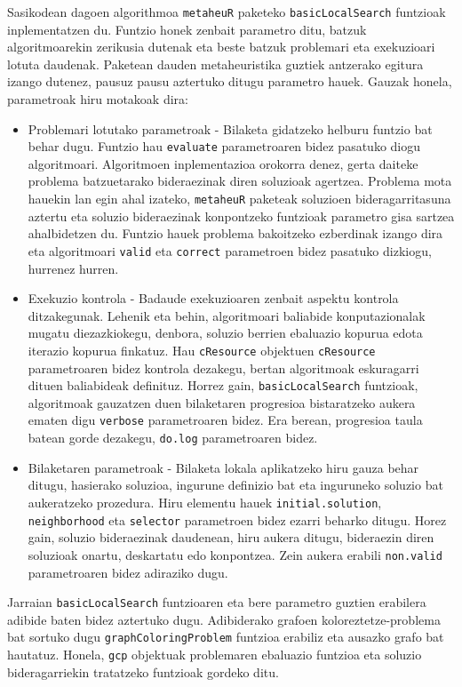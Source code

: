 \documentclass[eu]{ifirak}\usepackage[]{graphicx}\usepackage[]{color}
\newcommand{\code}[1]{\texttt{#1}}
\begin{document}
Sasikodean dagoen algorithmoa \code{metaheuR} paketeko \code{basicLocalSearch} funtzioak inplementatzen du. Funtzio honek zenbait parametro ditu, batzuk algoritmoarekin zerikusia dutenak eta beste batzuk problemari eta exekuzioari lotuta daudenak. Paketean dauden metaheuristika guztiek antzerako egitura izango dutenez, pausuz pausu aztertuko ditugu parametro hauek. Gauzak honela, parametroak hiru motakoak dira:
\begin{itemize}
\item Problemari lotutako parametroak - Bilaketa gidatzeko helburu funtzio bat behar dugu. Funtzio hau \code{evaluate} parametroaren bidez pasatuko diogu algoritmoari. Algoritmoen inplementazioa orokorra denez, gerta daiteke problema batzuetarako bideraezinak diren soluzioak agertzea. Problema mota hauekin lan egin ahal izateko, \code{metaheuR} paketeak soluzioen bideragarritasuna aztertu eta soluzio bideraezinak konpontzeko funtzioak parametro gisa sartzea ahalbidetzen du. Funtzio hauek problema bakoitzeko ezberdinak izango dira eta algoritmoari \code{valid} eta \code{correct} parametroen bidez pasatuko dizkiogu, hurrenez hurren.

\item Exekuzio kontrola - Badaude exekuzioaren zenbait aspektu kontrola ditzakegunak. Lehenik eta behin, algoritmoari baliabide konputazionalak mugatu diezazkiokegu, denbora, soluzio berrien ebaluazio kopurua edota iterazio kopurua finkatuz. Hau \code{cResource} objektuen  \code{cResource} parametroaren bidez kontrola dezakegu, bertan algoritmoak eskuragarri dituen baliabideak definituz. Horrez gain, \code{basicLocalSearch} funtzioak, algoritmoak gauzatzen duen bilaketaren progresioa bistaratzeko aukera ematen digu \code{verbose} parametroaren bidez. Era berean, progresioa taula batean gorde dezakegu, \code{do.log} parametroaren bidez.

\item Bilaketaren parametroak - Bilaketa lokala aplikatzeko hiru gauza behar ditugu, hasierako soluzioa, ingurune definizio bat eta inguruneko soluzio bat aukeratzeko prozedura. Hiru elementu hauek \code{initial.solution}, \code{neighborhood} eta \code{selector} parametroen bidez ezarri beharko ditugu. Horez gain, soluzio bideraezinak daudenean, hiru aukera ditugu, bideraezin diren soluzioak onartu, deskartatu edo konpontzea. Zein aukera erabili \code{non.valid} parametroaren bidez adiraziko dugu.
\end{itemize}

Jarraian \code{basicLocalSearch} funtzioaren eta bere parametro guztien erabilera adibide baten bidez aztertuko dugu. Adibiderako grafoen koloreztetze-problema bat sortuko dugu \code{graphColoringProblem} funtzioa erabiliz eta ausazko grafo bat hautatuz. Honela, \code{gcp} objektuak problemaren ebaluazio funtzioa eta soluzio bideragarriekin tratatzeko funtzioak gordeko ditu.
\end{document}
